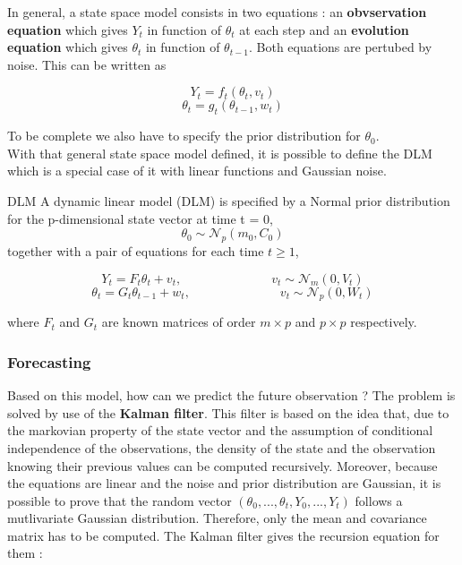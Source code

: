 \documentclass{article}
\begin{document}
In general, a state space model consists in two equations : an \textbf{obvservation equation} which gives $Y_t$ in function of $\theta_t$ at each step and an \textbf{evolution equation} which gives $\theta_t$ in function of $\theta_{t-1}$. Both equations are pertubed by noise. This can be written as

$$Y_t = f_t(\theta_t, v_t)$$
$$\theta_t = g_t(\theta_{t-1}, w_t)$$

To be complete we also have to specify the prior distribution for $\theta_0$. \\

With that general state space model defined, it is possible to define the DLM which is a special case of it with linear functions and Gaussian noise. \\

\theoremstyle{definition}
\begin{definition}{DLM}
A dynamic linear model (DLM) is specified by a Normal prior distribution for the p-dimensional state vector at time t = 0,
$$\theta_0 \sim \mathcal{N}_p(m_0, C_0)$$
together with a pair of equations for each time $t \ge 1$,

$$Y_t = F_t\theta_t + v_t, \hspace{3cm} v_t \sim \mathcal{N}_m(0, V_t)$$
$$\theta_t = G_t\theta_{t-1} + w_t, \hspace{3cm} v_t \sim \mathcal{N}_p(0, W_t)$$

where $F_t$ and $G_t$ are known matrices of order $m \times p$ and $p \times p$ respectively.
\end{definition}

\subsubsection*{Forecasting}

Based on this model, how can we predict the future observation ? The problem is solved by use of the \textbf{Kalman filter}. This filter is based on the idea that, due to the markovian property of the state vector and the assumption of conditional independence of the observations, the density of the state and the observation knowing their previous values can be computed recursively. Moreover, because the equations are linear and the noise and prior distribution are Gaussian, it is possible to prove that the random vector $(\theta_0, ..., \theta_t, Y_0, ..., Y_t)$ follows a mutlivariate Gaussian distribution. Therefore, only the mean and covariance matrix has to be computed. The Kalman filter gives the recursion equation for them : \\
\end{document}
